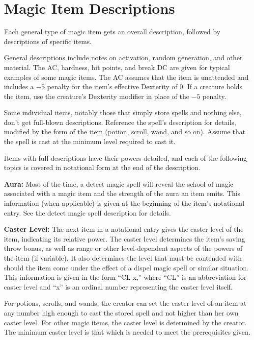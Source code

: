 \section{Magic Item Descriptions}
Each general type of magic item gets an overall description, followed by descriptions of specific items.

General descriptions include notes on activation, random generation, and other material. The AC, hardness, hit points, and break DC are given for typical examples of some magic items. The AC assumes that the item is unattended and includes a $-5$ penalty for the item's effective Dexterity of 0. If a creature holds the item, use the creature's Dexterity modifier in place of the $-5$ penalty.

Some individual items, notably those that simply store spells and nothing else, don't get full-blown descriptions. Reference the spell's description for details, modified by the form of the item (potion, scroll, wand, and so on). Assume that the spell is cast at the minimum level required to cast it.

Items with full descriptions have their powers detailed, and each of the following topics is covered in notational form at the end of the description.

\textbf{Aura:} Most of the time, a detect magic spell will reveal the school of magic associated with a magic item and the strength of the aura an item emits. This information (when applicable) is given at the beginning of the item's notational entry. See the detect magic spell description for details.

\textbf{Caster Level:} The next item in a notational entry gives the caster level of the item, indicating its relative power. The caster level determines the item's saving throw bonus, as well as range or other level-dependent aspects of the powers of the item (if variable). It also determines the level that must be contended with should the item come under the effect of a dispel magic spell or similar situation. This information is given in the form ``CL x,'' where ``CL'' is an abbreviation for caster level and ``x'' is an ordinal number representing the caster level itself.

For potions, scrolls, and wands, the creator can set the caster level of an item at any number high enough to cast the stored spell and not higher than her own caster level. For other magic items, the caster level is determined by the creator. The minimum caster level is that which is needed to meet the prerequisites given.

